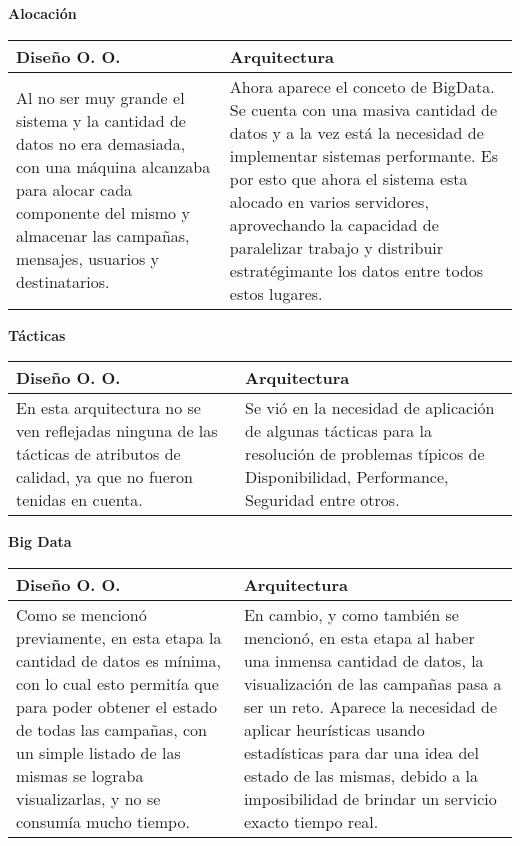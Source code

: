{\bf Alocaci\'on} \\
\begin{tabular}{| p{8cm} | p{8cm} |}
\hline
Dise\~no O. O. & Arquitectura \\ \hline \hline

Al no ser muy grande el sistema y la cantidad de datos no era demasiada, con una m\'aquina alcanzaba para alocar cada componente del mismo y almacenar las campa\~nas, mensajes, usuarios y destinatarios. & Ahora aparece el conceto de BigData. Se cuenta con una masiva cantidad de datos y a la vez est\'a la necesidad de implementar sistemas performante. Es por esto que ahora el sistema esta alocado en varios servidores, aprovechando la capacidad de paralelizar trabajo y distribuir estrat\'egimante los datos entre todos estos lugares. \\ \hline
\end{tabular}


{\bf T\'acticas} \\
\begin{tabular}{| p{8cm} | p{8cm} |}
\hline
Dise\~no O. O. & Arquitectura \\ \hline \hline

En esta arquitectura no se ven reflejadas ninguna de las t\'acticas de atributos de calidad, ya que no fueron tenidas en cuenta. & Se vi\'o en la necesidad de aplicaci\'on de algunas t\'acticas para la resoluci\'on de problemas t\'ipicos de Disponibilidad, Performance, Seguridad entre otros. \\ \hline
\end{tabular}


{\bf Big Data} \\
\begin{tabular}{| p{8cm} | p{8cm} |}
\hline
Dise\~no O. O. & Arquitectura \\ \hline \hline

Como se mencion\'o previamente, en esta etapa la cantidad de datos es m\'inima, con lo cual esto permit\'ia que para poder obtener el estado de todas las campa\~nas, con un simple listado de las mismas se lograba visualizarlas, y no se consum\'ia mucho tiempo. & En cambio, y como tambi\'en se mencion\'o, en esta etapa al haber una inmensa cantidad de datos, la visualizaci\'on de las campa\~nas pasa a ser un reto. Aparece la necesidad de aplicar heur\'isticas usando estad\'isticas para dar una idea del estado de las mismas, debido a la imposibilidad de brindar un servicio exacto tiempo real. \\ \hline
\end{tabular}